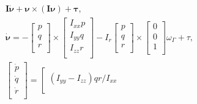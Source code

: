 \documentclass[11pt]{exam}
\begin{document}
        \begin{equation}
            \begin{gathered}
                \boldsymbol{I\dot{\nu}} + \boldsymbol{\nu}\times(\boldsymbol{I\nu}) + \boldsymbol{\tau}, \\
                \boldsymbol{\dot{\nu}} = -
                \left[{
                    \begin{array}{c}
                        p \\
                        q \\
                        r \\
                    \end{array} 
                }\right] \times 
                \left[{
                    \begin{array}{c}
                        I_{xx}p \\
                        I_{yy}q \\
                        I_{zz}r \\
                    \end{array} 
                }\right] - I_r
                \left[{
                    \begin{array}{c}
                        p \\
                        q \\
                        r \\
                    \end{array} 
                }\right] \times 
                \left[{
                    \begin{array}{c}
                        0 \\
                        0 \\
                        1 \\
                    \end{array} 
                }\right] \omega_{\Gamma} + \tau, \\
                \left[{
                    \begin{array}{c}
                        \dot{p} \\
                        \dot{q} \\
                        \dot{r} \\
                    \end{array} 
                }\right] = 
                \left[{
                    \begin{array}{c}
                        (I_{yy} - I_{zz})qr/I_{xx} \\

\end{array}}
\end{gathered}
\end{equation}
\end{document}

